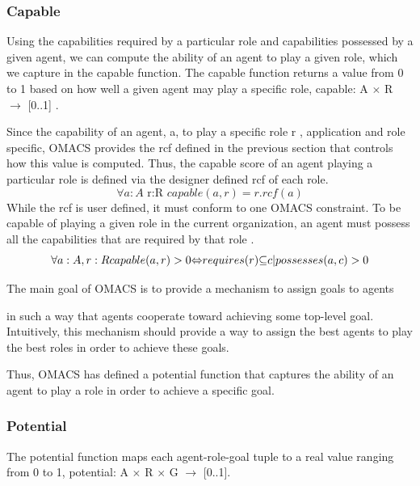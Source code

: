 \subsubsection{Capable}
Using the capabilities required by a particular role and capabilities possessed by a given agent, we can compute the ability of an agent to play a given role, which we capture in the capable function. The capable function returns a value from 0 to 1 based on how well a given agent may play a specific role, capable: A $\times$ R $\rightarrow$ {[}0..1{]} . \cite{omacs2}

Since the capability of an agent, a, to play a specific role  r , application and role specific, OMACS provides the rcf defined in the previous section that controls how this value is computed. Thus, the capable score of an agent playing a particular role is defined via the designer defined rcf of each role.
\begin{equation}
\forall a:A\textrm{ r:R }capable(a,r)=r.rcf(a)\label{eq:Funccapable}
\end{equation}
While the rcf is user defined, it must conform to one OMACS constraint. 
To be capable of playing a given role in the current organization,
 an agent must possess all the capabilities that are required by that role . \cite{omacs2}
\begin{equation}
\text{\ensuremath{\forall}}a:A,r:Rcapable(a,r)>0\text{\ensuremath{\Leftrightarrow}}requires(r)\text{\ensuremath{\subseteq}}{c|possesses(a,c)>0}\label{eq:FuncCapable2}
\end{equation}






The main goal of OMACS is to provide a mechanism to assign goals to agents \cite{omacs2}

in such a way that agents cooperate toward achieving some top-level goal.
Intuitively, this mechanism should provide a way to assign the best agents 
to play the best roles in order to achieve these goals. 



Thus, OMACS has defined  a potential function that captures the ability of an agent 
to play a role in order  to achieve a specific goal.   \cite{omacs2}



\subsubsection{Potential}
The potential function maps each agent-role-goal tuple to a real value ranging from 0 to 1, 
potential: A $\times$ R $\times$ G $\rightarrow$ [0..1].\cite{omacs4}

